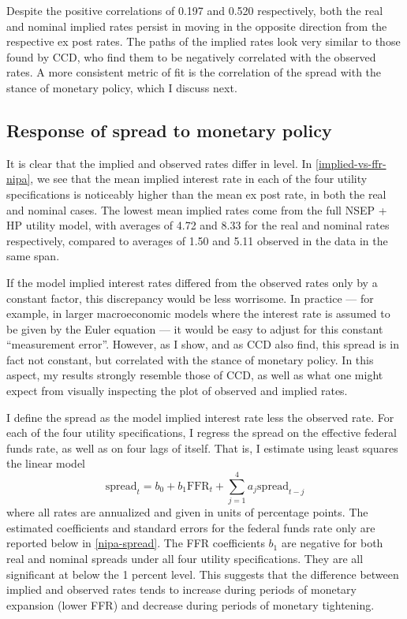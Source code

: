 Despite the positive correlations of 0.197 and 0.520 respectively, both the real and nominal implied rates persist in moving in the opposite direction from the respective ex post rates. The paths of the implied rates look very similar to those found by CCD, who find them to be negatively correlated with the observed rates. A more consistent metric of fit is the correlation of the spread with the stance of monetary policy, which I discuss next.




\subsection{Response of spread to monetary policy}
It is clear that the implied and observed rates differ in level. In \autoref{implied-vs-ffr-nipa}, we see that the mean implied interest rate in each of the four utility specifications is noticeably higher than the mean ex post rate, in both the real and nominal cases. The lowest mean implied rates come from the full NSEP + HP utility model, with averages of 4.72 and 8.33 for the real and nominal rates respectively, compared to averages of 1.50 and 5.11 observed in the data in the same span.

If the model implied interest rates differed from the observed rates only by a constant factor, this discrepancy would be less worrisome. In practice --- for example, in larger macroeconomic models where the interest rate is assumed to be given by the Euler equation --- it would be easy to adjust for this constant ``measurement error''. However, as I show, and as CCD also find, this spread is in fact not constant, but correlated with the stance of monetary policy. In this aspect, my results strongly resemble those of CCD, as well as what one might expect from visually inspecting the plot of observed and implied rates.

I define the spread as the model implied interest rate less the observed rate. For each of the four utility specifications, I regress the spread on the effective federal funds rate, as well as on four lags of itself. That is, I estimate using least squares the linear model
\begin{equation}
\label{spread-ffr-regression}
\mathrm{spread}_t = b_0 + b_1 \mathrm{FFR}_t + \sum_{j=1}^4 a_j \mathrm{spread}_{t-j}
\end{equation}
where all rates are annualized and given in units of percentage points. The estimated coefficients and standard errors for the federal funds rate only are reported below in \autoref{nipa-spread}. The FFR coefficients $b_1$ are negative for both real and nominal spreads under all four utility specifications. They are all significant at below the 1 percent level. This suggests that the difference between implied and observed rates tends to increase during periods of monetary expansion (lower FFR) and decrease during periods of monetary tightening.

